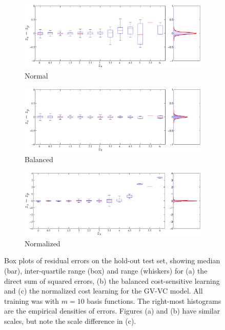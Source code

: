 \documentclass[useAMS,usenatbib,fleqn]{mn2e}
\begin{document}
\begin{figure}
        \centering
        \begin{subfigure}[b]{\columnwidth}
                \includegraphics[width=\textwidth]{figures/Zspec-Zphot_normal.eps}
                \caption{Normal}
                \label{fig-normal}
        \end{subfigure}	
        \begin{subfigure}[b]{\columnwidth}
                \includegraphics[width=\textwidth]{figures/Zspec-Zphot_balanced.eps}
                \caption{Balanced}
                \label{fig-balanced}
        \end{subfigure}
       \begin{subfigure}[b]{\columnwidth}
                \includegraphics[width=\textwidth]{figures/Zspec-Zphot_normalised.eps}
                \caption{Normalized}
                \label{fig-normalized}
        \end{subfigure}
       \caption{Box plots of residual errors on the hold-out test set, showing median (bar), inter-quartile range (box) and range (whiskers) for (a) the direct sum of squared errors, (b) the balanced cost-sensitive learning and (c) the normalized cost learning for the GV-VC model. All training was with $m=10$ basis functions. The right-most histograms are the empirical densities of errors. Figures (a) and (b) have similar scales, but note the scale difference in (c).}
	\label{fig-normal-balanced}
\end{figure}
\end{document}

